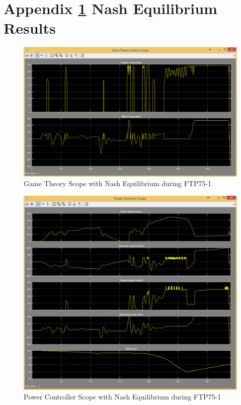 \appendix
\chapter{Appendix \ref{app:1} Nash Equilibrium Results}
\label{app:1}


\begin{figure}[h]
\centering
\includegraphics[scale=0.4]{figures/NashEquilibrium/FTP75-1/gameTheory13Juni}
\caption{Game Theory Scope with Nash Equilibrium during FTP75-1}
\label{fig:gtne1}
\end{figure}


\begin{figure}[h]
\centering
\includegraphics[scale=0.4]{figures/NashEquilibrium/FTP75-1/powerController13Juni}
\caption{Power Controller Scope with Nash Equilibrium during FTP75-1}
\label{fig:pcne1}
\end{figure}

